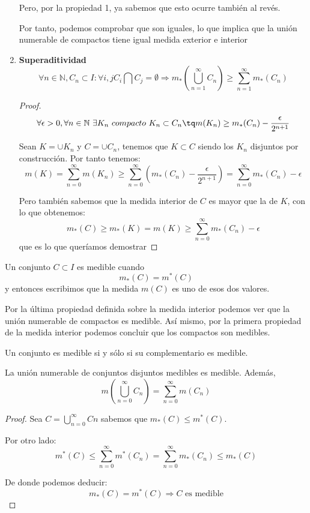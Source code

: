 \documentclass{apuntes}
\begin{document}
\begin{enumerate}
Pero, por la propiedad 1, ya sabemos que esto ocurre también al revés.

Por tanto, podemos comprobar que son iguales, lo que implica que la unión numerable de compactos tiene igual medida exterior e interior

%
\item \textbf{Superaditividad}
\[\forall n \in \mathbb{N}, C_n \subset I : \forall i,j C_i \bigcap C_j = \emptyset \Rightarrow m_*(\bigcup_{n=1}^{\infty} C_n) \geq \sum_{n=1}^{\infty}m_*(C_n)\]

\begin{proof}
\[ \forall \epsilon > 0, \forall n \in \mathbb{N} \ \exists K_n \ compacto \ K_n \subset C_n \tq m(K_n) \geq m_*(C_n) - \frac{\epsilon}{2^{n+1}}\]

Sean $K=\cup K_n$ y $C=\cup C_n$, tenemos que $K\subset C$  siendo los $K_n$ disjuntos por construcción. Por tanto tenemos:
\[m(K) = \sum _{n=0}^{\infty}m(K_n) \geq \sum _{n=0}^{\infty}(m_*(C_n)- \frac{\epsilon}{2^{n+1}}) = \sum_{n=0}^{\infty} m_*(C_n) - \epsilon\]

Pero también sabemos que la medida interior de $C$ es mayor que la de $K$, con lo que obtenemos:
\[m_*(C) \geq m_*(K) = m(K) \geq \sum_{n=0}^{\infty} m_*(C_n) - \epsilon\]
que es lo que queríamos demostrar
\end{proof}
\end{enumerate}

\begin{defn}[Medibilidad]
Un conjunto $C \subset I$ es medible cuando
\[m_*(C)=m^*(C)\]
y entonces escribimos que la medida $m(C)$ es uno de esos dos valores.
\end{defn}

Por la última propiedad definida sobre la medida interior podemos ver que la unión numerable de compactos es medible. Así mismo, por la primera propiedad de la medida interior podemos concluir que los compactos son medibles.

\obs Un conjunto es medible si y sólo si su complementario es medible.

\begin{prop} La unión numerable de conjuntos disjuntos medibles es medible. Además,
\[m\left(\bigcup_{n=0}^{\infty}C_n\right) = \sum_{n=0}^{\infty} m(C_n)\]
\end{prop}
\begin{proof}
Sea $C=\bigcup_{n=0}^{\infty} Cn$  sabemos que $m_*(C) \leq m^*(C)$.

Por otro lado:
\[m^*(C) \leq \sum_{n=0}^{\infty}m^*(C_n) = \sum_{n=0}^{\infty}m_*(C_n) \leq m_*(C) \]

De donde podemos deducir:
\[m_*(C) = m^*(C) \Rightarrow C \text{ es  medible} \]
\end{proof}
\end{document}
